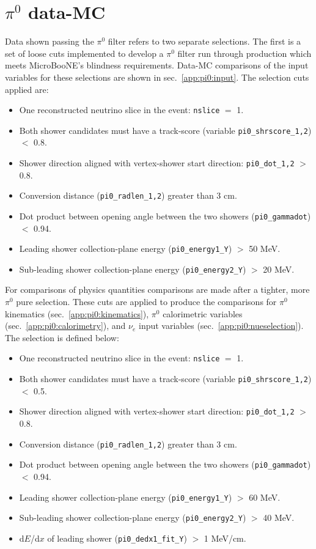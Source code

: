 \section{$\pi^0$ data-MC}
\label{app:pi0}
\par Data shown passing the $\pi^0$ filter refers to two separate selections. The first is a set of loose cuts implemented to develop a $\pi^0$ filter run through production which meets MicroBooNE's blindness requirements. Data-MC comparisons of the input variables for these selections are shown in sec.~\ref{app:pi0:input}. The selection cuts applied are:
\begin{itemize}
    \item One reconstructed neutrino slice in the event: \texttt{nslice} $=$ 1.
    \item Both shower candidates must have a track-score (variable \texttt{pi0\_shrscore\_1,2}) $<$ 0.8.
    \item Shower direction aligned with vertex-shower start direction: \texttt{pi0\_dot\_1,2} $>$ 0.8.
    \item Conversion distance (\texttt{pi0\_radlen\_1,2}) greater than 3 cm.
    \item Dot product between opening angle between the two showers (\texttt{pi0\_gammadot}) $<$ 0.94.
    \item Leading shower collection-plane energy (\texttt{pi0\_energy1\_Y}) $>$ 50 MeV.
    \item Sub-leading shower collection-plane energy (\texttt{pi0\_energy2\_Y}) $>$ 20 MeV.
\end{itemize}
For comparisons of physics quantities comparisons are made after a tighter, more $\pi^0$ pure selection. These cuts are applied to produce the comparisons for $\pi^0$ kinematics (sec.~\ref{app:pi0:kinematics}), $\pi^0$ calorimetric variables (sec.~\ref{app:pi0:calorimetry}), and $\nu_e$ input variables (sec.~\ref{app:pi0:nueselection}). The selection is defined below:
\begin{itemize}
    \item One reconstructed neutrino slice in the event: \texttt{nslice} $=$ 1.
    \item Both shower candidates must have a track-score (variable \texttt{pi0\_shrscore\_1,2}) $<$ 0.5.
    \item Shower direction aligned with vertex-shower start direction: \texttt{pi0\_dot\_1,2} $>$ 0.8.
    \item Conversion distance (\texttt{pi0\_radlen\_1,2}) greater than 3 cm.
    \item Dot product between opening angle between the two showers (\texttt{pi0\_gammadot}) $<$ 0.94.
    \item Leading shower collection-plane energy (\texttt{pi0\_energy1\_Y}) $>$ 60 MeV.
    \item Sub-leading shower collection-plane energy (\texttt{pi0\_energy2\_Y}) $>$ 40 MeV.
    \item d$E$/d$x$  of leading shower (\texttt{pi0\_dedx1\_fit\_Y}) $>$ 1 MeV/cm.
\end{itemize}
